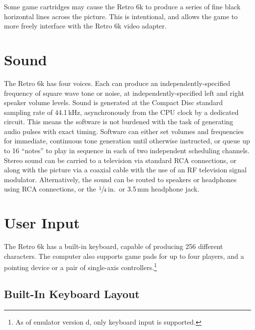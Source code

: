 \documentclass[12pt]{{memoir}}
\begin{document}
Some game cartridges may cause the Retro 6k to produce a series of fine black horizontal lines across the picture. This is intentional, and allows the game to more freely interface with the Retro 6k video adapter. 

\section{Sound}

The Retro 6k has four voices. Each can produce an independently-specified frequency of square wave tone or noise, at independently-specified left and right speaker volume levels. Sound is generated at the Compact Disc standard sampling rate of 44.1\,kHz, asynchronously from the CPU clock by a dedicated circuit. This means the software is not burdened with the task of generating audio pulses with exact timing. Software can either set volumes and frequencies for immediate, continuous tone generation until otherwise instructed, or queue up to 16 ``notes'' to play in sequence in each of two independent scheduling channels. Stereo sound can be carried to a television via standard RCA connections, or along with the picture via a coaxial cable with the use of an RF television signal modulator. Alternatively, the sound can be routed to speakers or headphones using RCA connections, or the $\sfrac{1}{4}$\,in.\ or 3.5\,mm headphone jack.

\section{User Input}

The Retro 6k has a built-in keyboard, capable of producing 256 different characters. The computer also supports game pads for up to four players, and a pointing device or a pair of single-axis controllers.\footnote{As of emulator version d, only keyboard input is supported.}

\subsection{Built-In Keyboard Layout}
\end{document}
